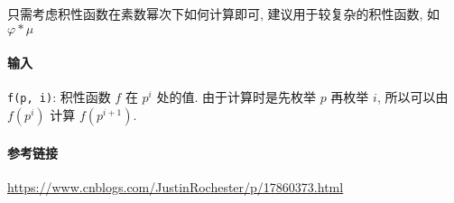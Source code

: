 只需考虑积性函数在素数幂次下如何计算即可, 建议用于较复杂的积性函数, 如 \(\varphi*\mu\)

\paragraph{输入}

\verb|f(p, i)|: 积性函数 \(f\) 在 \(p^i\) 处的值. 由于计算时是先枚举 \(p\) 再枚举 \(i\), 所以可以由 \(f(p^i)\) 计算 \(f(p^{i+1})\).

\paragraph{参考链接}

\url{https://www.cnblogs.com/JustinRochester/p/17860373.html}
